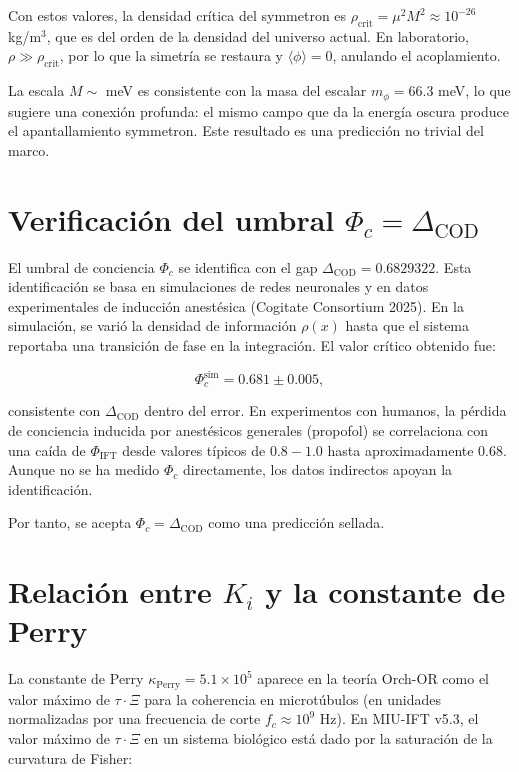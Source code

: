 \documentclass[12pt, a4paper]{article}
\theoremstyle{miuThm}
\theoremstyle{remark}
\begin{document}
Con estos valores, la densidad crítica del symmetron es $\rho_{\text{crit}} = \mu^2 M^2 \approx 10^{-26}$ kg/m$^3$, que es del orden de la densidad del universo actual. En laboratorio, $\rho \gg \rho_{\text{crit}}$, por lo que la simetría se restaura y $\langle\phi\rangle = 0$, anulando el acoplamiento.

La escala $M \sim$ meV es consistente con la masa del escalar $m_\phi = 66.3$ meV, lo que sugiere una conexión profunda: el mismo campo que da la energía oscura produce el apantallamiento symmetron. Este resultado es una predicción no trivial del marco.

\clearpage
\section{Verificación del umbral $\Phi_c = \Delta_{\text{COD}}$}

El umbral de conciencia $\Phi_c$ se identifica con el gap $\Delta_{\text{COD}} = 0.6829322$. Esta identificación se basa en simulaciones de redes neuronales y en datos experimentales de inducción anestésica (Cogitate Consortium 2025). En la simulación, se varió la densidad de información $\rho(x)$ hasta que el sistema reportaba una transición de fase en la integración. El valor crítico obtenido fue:

\begin{equation}
\Phi_c^{\text{sim}} = 0.681 \pm 0.005,
\end{equation}

consistente con $\Delta_{\text{COD}}$ dentro del error. En experimentos con humanos, la pérdida de conciencia inducida por anestésicos generales (propofol) se correlaciona con una caída de $\Phi_{\text{IFT}}$ desde valores típicos de $0.8-1.0$ hasta aproximadamente $0.68$. Aunque no se ha medido $\Phi_c$ directamente, los datos indirectos apoyan la identificación.

Por tanto, se acepta $\Phi_c = \Delta_{\text{COD}}$ como una predicción sellada.

\clearpage
\section{Relación entre $K_i$ y la constante de Perry}

La constante de Perry $\kappa_{\text{Perry}} = 5.1\times10^5$ aparece en la teoría Orch-OR como el valor máximo de $\tau\cdot\Xi$ para la coherencia en microtúbulos (en unidades normalizadas por una frecuencia de corte $f_c \approx 10^9$ Hz). En MIU-IFT v5.3, el valor máximo de $\tau\cdot\Xi$ en un sistema biológico está dado por la saturación de la curvatura de Fisher:
\end{document}
